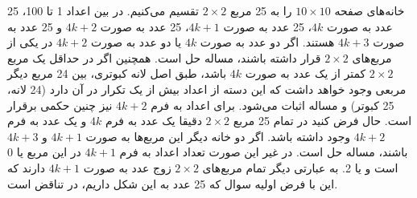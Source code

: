 \p
خانه‌های صفحه 
$10\times10$
را به 25 مربع
$2\times2$
تقسیم می‌کنیم. در بین اعداد 1 تا 100، 25 عدد به صورت
$4k$،
25 عدد به صورت
$4k + 1$،
25 عدد به صورت
$4k + 2$
و 25 عدد به صورت 
$4k + 3$
هستند. 
اگر دو عدد به صورت
$4k$
یا دو عدد به صورت
$4k + 2$
در یکی از مربع‌های
$2\times2$
قرار داشته باشند، مساله حل است.
همچنین اگر در حداقل یک مربع 
$2\times2$
کمتر از یک عدد به صورت
$4k$
باشد، طبق اصل لانه کبوتری، بین 24 مربع دیگر مربعی وجود خواهد داشت که این دسته از اعداد بیش از یک تکرار در آن دارد (24 لانه، 25 کبوتر) و مساله اثبات می‌شود.
برای اعداد به فرم
$4k + 2$
نیز چنین حکمی برقرار است.
حال فرض کنید در تمام 25 مربع 
$2\times2$
دقیقا یک عدد به فرم
$4k$
و یک عدد به فرم
$4k + 2$
وجود داشته باشد.
اگر دو خانه دیگر این مربع‌ها به صورت 
$4k + 1$
و 
$4k + 3$
باشند، مساله حل است.
در غیر این صورت تعداد اعداد به فرم
$4k + 1$
در این مربع یا 0 است و یا 2. به عبارتی دیگر تمام مربع‌های 
$2\times2$
زوج عدد به صورت
$4k + 1$
دارند که این با فرض اولیه سوال که 25 عدد به این شکل داریم، در تناقض است.
